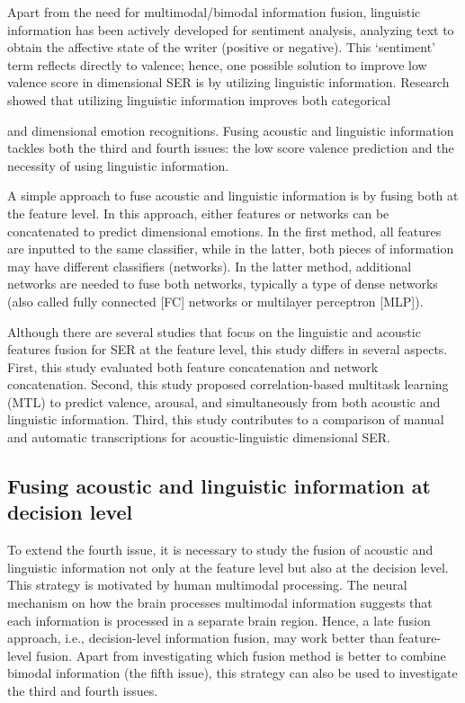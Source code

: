 Apart from the need for multimodal/bimodal information fusion, linguistic
information has been actively developed for sentiment analysis, analyzing text
to obtain the affective state of the writer (positive or negative).  This
`sentiment' term reflects directly to valence; hence, one possible solution to
improve low valence score in dimensional SER is by utilizing linguistic
information. Research showed that utilizing linguistic information improves
both categorical {\cite{ Yoon2018} and dimensional \cite{Karadogan2012} emotion
recognitions. Fusing acoustic and linguistic information tackles both the third
and fourth issues: the low score valence prediction and the necessity of using linguistic information.

A simple approach to fuse acoustic and linguistic information is by fusing both
at the feature level. In this approach, either features or networks can be
concatenated to predict dimensional emotions. In the first method, all features
are inputted to the same classifier, while in the latter, both pieces of
information may have different classifiers (networks). In the latter method,
additional networks are needed to fuse both networks, typically a type of dense
networks (also called fully connected [FC] networks or multilayer perceptron
[MLP]).

Although there are several studies that focus on the linguistic and acoustic
features fusion for SER at the feature level, this study differs in several
aspects. First, this study evaluated both feature concatenation and network
concatenation. Second, this study proposed correlation-based multitask learning
(MTL) to predict valence, arousal, and simultaneously from both acoustic and
linguistic information. Third, this study contributes to a comparison of manual
and automatic transcriptions for acoustic-linguistic dimensional SER.

\subsection{Fusing acoustic and linguistic information at decision level}
To extend the fourth issue, it is necessary to study the fusion of acoustic and
linguistic information not only at the feature level but also at the decision
level. This strategy is motivated by human multimodal processing. The neural
mechanism on how the brain processes multimodal information suggests that each
information is processed in a separate brain region. Hence, a late fusion
approach, i.e., decision-level information fusion, may work better than
feature-level fusion. Apart from investigating which fusion method is better to
combine bimodal information (the fifth issue), this strategy can also be used
to investigate the third and fourth issues.

}
